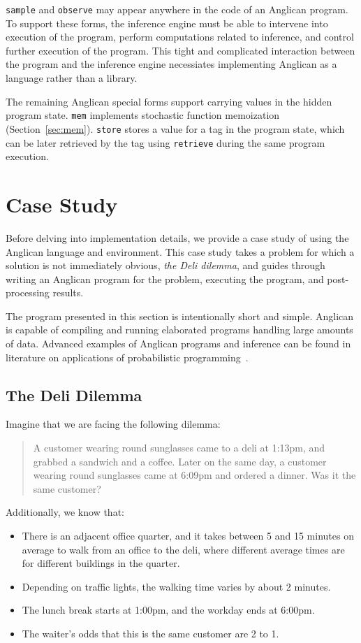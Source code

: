 \documentclass[preprint]{sigplanconf}
\begin{document}
\texttt{sample} and \texttt{observe} may appear anywhere in the
code of an Anglican program. To support these forms, the
inference engine must be able to intervene into execution of the
program, perform computations related to inference, and control
further execution of the program. This tight and complicated
interaction between the program and the inference engine
necessiates implementing Anglican as a language rather than a
library.

The remaining Anglican special forms support carrying values in
the hidden program state. \texttt{mem} implements stochastic
function  memoization (Section~\ref{sec:mem}). \texttt{store}
stores a value for a tag in the program state, which can be
later retrieved by the tag using \texttt{retrieve} during the same
program execution.

\section{Case Study}
\label{seq:study}

Before delving into implementation details, we provide a case
study of using the Anglican language and environment. This case
study takes a problem for which a solution is not immediately
obvious, \textit{the Deli dilemma}, and guides through writing
an Anglican program for the problem, executing the program, and
post-processing results. 

The program presented in this section is intentionally short and
simple. Anglican is capable of compiling and running elaborated
programs handling large amounts of data. Advanced examples of
Anglican programs and inference can be found in literature on
applications of probabilistic programming~\cite{PLW15, P16, MPT+16}.

\subsection{The Deli Dilemma}
\label{seq:deli}

Imagine that we are facing the following dilemma:
\begin{quote}
A customer wearing round sunglasses came to a deli at 1:13pm,
and grabbed a sandwich and a coffee. Later on the same day, a
customer wearing round sunglasses came at 6:09pm and ordered a
dinner.  Was it the same customer?
\end{quote}
Additionally, we know that:
\begin{itemize}
    \item There is an adjacent office quarter, and it takes
        between 5 and 15 minutes on average to walk from an
        office to the deli, where different average times are  for
        different buildings in the quarter.
    \item Depending on traffic lights, the walking time varies by about 2
        minutes.
    \item The lunch break starts at 1:00pm, and the workday ends at 6:00pm.
    \item The waiter's odds that this is the same customer are 2 to 1.
\end{itemize}
\end{document}
